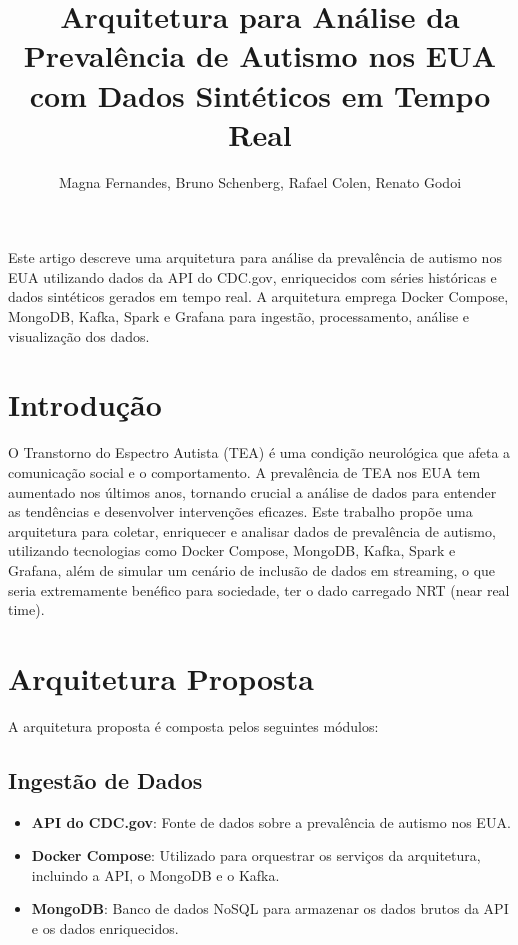 \documentclass[12pt]{article}
\title{Arquitetura para Análise da Prevalência de Autismo nos EUA com Dados Sintéticos em Tempo Real}
\author{Magna Fernandes\inst{1}, Bruno Schenberg\inst{1}, Rafael Colen\inst{1}, Renato Godoi\inst{1}}
\begin{document}
 

\maketitle
     
\begin{resumo} 
  Este artigo descreve uma arquitetura para análise da prevalência de autismo nos EUA utilizando dados da API do CDC.gov, enriquecidos com séries históricas e dados sintéticos gerados em tempo real. A arquitetura emprega Docker Compose, MongoDB, Kafka, Spark e Grafana para ingestão, processamento, análise e visualização dos dados.
\end{resumo}


\section{Introdução}

O Transtorno do Espectro Autista (TEA) é uma condição neurológica que afeta a comunicação social e o comportamento. A prevalência de TEA nos EUA tem aumentado nos últimos anos, tornando crucial a análise de dados para entender as tendências e desenvolver intervenções eficazes. Este trabalho propõe uma arquitetura para coletar, enriquecer e analisar dados de prevalência de autismo, utilizando tecnologias como Docker Compose, MongoDB, Kafka, Spark e Grafana, além de simular um cenário de inclusão de dados em streaming, o que seria extremamente benéfico para sociedade, ter o dado carregado NRT (near real time).

\section{Arquitetura Proposta} \label{sec:firstpage}

A arquitetura proposta é composta pelos seguintes módulos:

\subsection{Ingestão de Dados}
\begin{itemize}
    \item \textbf{API do CDC.gov}: Fonte de dados sobre a prevalência de autismo nos EUA.
    \item \textbf{Docker Compose}: Utilizado para orquestrar os serviços da arquitetura, incluindo a API, o MongoDB e o Kafka.
    \item \textbf{MongoDB}: Banco de dados NoSQL para armazenar os dados brutos da API e os dados enriquecidos.
\end{itemize}
\end{document}
